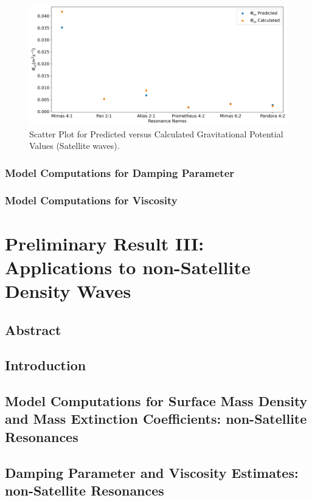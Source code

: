 \documentclass{article}
\begin{document}
\begin{figure}
    \centering
    \includegraphics[width=1\linewidth]{predicted_plus_calculated_satellite_potential.png}
    \caption{Scatter Plot for Predicted versus Calculated Gravitational Potential Values (Satellite waves).}
    \label{fig:enter-label}
\end{figure}


\subsubsection{Model Computations for Damping Parameter}

\subsubsection{Model Computations for Viscosity}


\section{Preliminary Result III: Applications to non-Satellite Density Waves}

\subsection{Abstract}

\subsection{Introduction}
\subsection{Model Computations for Surface Mass Density and Mass Extinction Coefficients: non-Satellite Resonances}
\subsection{Damping Parameter and Viscosity Estimates: non-Satellite Resonances}
\end{document}
